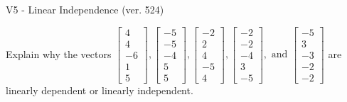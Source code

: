 \begin{exercise}
  \begin{exerciseTitle}V5 - Linear Independence (ver. 524)\end{exerciseTitle}
  \begin{exerciseStatement}
    Explain why the vectors \(\left[\begin{array}{r}
4 \\
4 \\
-6 \\
1 \\
5
\end{array}\right] , \left[\begin{array}{r}
-5 \\
-5 \\
-4 \\
5 \\
5
\end{array}\right] , \left[\begin{array}{r}
-2 \\
2 \\
4 \\
-5 \\
4
\end{array}\right] , \left[\begin{array}{r}
-2 \\
-2 \\
-4 \\
3 \\
-5
\end{array}\right] , \text{ and } \left[\begin{array}{r}
-5 \\
3 \\
-3 \\
-2 \\
-2
\end{array}\right]\) are linearly dependent or linearly independent.	



\end{exerciseStatement}
\end{exercise}
